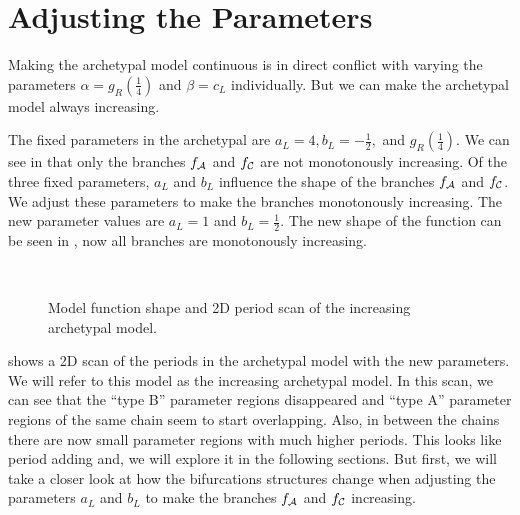 \section{Adjusting the Parameters}
\label{sec:add:parameters}

Making the archetypal model continuous is in direct conflict with varying the parameters $\alpha = g_R\left(\frac{1}{4}\right)$ and $\beta = c_L$ individually.
But we can make the archetypal model always increasing.

The fixed parameters in the archetypal are $a_L = 4, b_L = -\frac{1}{2},$ and $g_R\left(\frac{1}{4}\right)$.
We can see in  that only the branches $f_{\mathcal{A}}$ and $f_{\mathcal{C}}$ are not monotonously increasing.
Of the three fixed parameters, $a_L$ and $b_L$ influence the shape of the branches $f_{\mathcal{A}}$ and $f_{\mathcal{C}}$.
We adjust these parameters to make the branches monotonously increasing.
The new parameter values are $a_L = 1$ and $b_L = \frac{1}{2}$.
The new shape of the function can be seen in , now all branches are monotonously increasing.

\begin{figure}
	\centering
	\\
	\caption[Model function shape and 2D period scan of the increasing archetypal model]{
		Model function shape and 2D period scan of the increasing archetypal model.
	}
\end{figure}

 shows a 2D scan of the periods in the archetypal model with the new parameters.
We will refer to this model as the increasing archetypal model.
In this scan, we can see that the ``type B'' parameter regions disappeared and ``type A'' parameter regions of the same chain seem to start overlapping.
Also, in between the chains there are now small parameter regions with much higher periods.
This looks like period adding and, we will explore it in the following sections.
But first, we will take a closer look at how the bifurcations structures change when adjusting the parameters $a_L$ and $b_L$ to make the branches $f_{\mathcal{A}}$ and $f_{\mathcal{C}}$ increasing.
